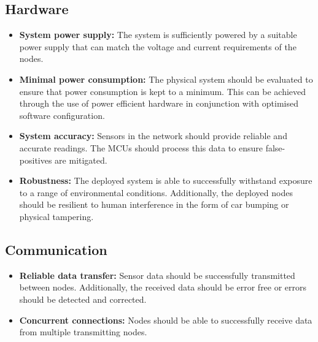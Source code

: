 \documentclass[10pt,twocolumn]{witseiepaper}
\begin{document}
	\subsection{Hardware}
		\begin{itemize}
			\item \textbf{System power supply:} The system is sufficiently powered by a suitable power supply that can match the voltage and current requirements of the nodes.
			\item \textbf{Minimal power consumption:} The physical system should be evaluated to ensure that power consumption is kept to a minimum. This can be achieved through the use of power efficient hardware in conjunction with optimised software configuration.
			\vspace{1em}
			\item \textbf{System accuracy:} Sensors in the network should provide reliable and accurate readings. The MCUs should process this data to ensure false-positives are mitigated.
			\vspace{1em}
			\item \textbf{Robustness:} The deployed system is able to successfully withstand exposure to a range of environmental conditions. Additionally, the deployed nodes should be resilient to human interference in the form of car bumping or physical tampering.
		\end{itemize}
	
	\subsection{Communication}
		\begin{itemize}
			\item \textbf{Reliable data transfer:} Sensor data should be successfully transmitted between nodes. Additionally, the received data should be error free or errors should be detected and corrected.
			\vspace{1em}
			\item  \textbf{Concurrent connections:} Nodes should be able to successfully receive data from multiple transmitting nodes.
		\end{itemize}
	
\end{document}
